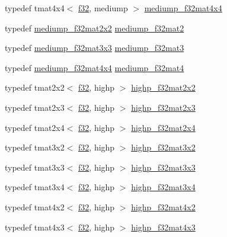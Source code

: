 \begin{DoxyCompactItemize}
typedef tmat4x4$<$ \hyperlink{group__gtc__type__precision_ga0ec999b57f5330d9021256e96038df04}{f32}, mediump $>$ \hyperlink{namespaceglm_a3c3a55da431fd8deef6a4ce3bb3bda99}{mediump\+\_\+f32mat4x4}
\item 
typedef \hyperlink{namespaceglm_a4b54e9273e523b0e07e5a0c92eb1ff9e}{mediump\+\_\+f32mat2x2} \hyperlink{namespaceglm_a103735a38477f7c389b36aae0fbdf274}{mediump\+\_\+f32mat2}
\item 
typedef \hyperlink{namespaceglm_a40d94024c0ce48a6819a25d16a7955b7}{mediump\+\_\+f32mat3x3} \hyperlink{namespaceglm_ae263a08ef179894fdd36f9a51698c4ab}{mediump\+\_\+f32mat3}
\item 
typedef \hyperlink{namespaceglm_a3c3a55da431fd8deef6a4ce3bb3bda99}{mediump\+\_\+f32mat4x4} \hyperlink{namespaceglm_a56bd98ec31b6abc0315d688d4ecd94a0}{mediump\+\_\+f32mat4}
\item 
typedef tmat2x2$<$ \hyperlink{group__gtc__type__precision_ga0ec999b57f5330d9021256e96038df04}{f32}, highp $>$ \hyperlink{namespaceglm_ab78dad85a95f5fcf418769d76c8fbad1}{highp\+\_\+f32mat2x2}
\item 
typedef tmat2x3$<$ \hyperlink{group__gtc__type__precision_ga0ec999b57f5330d9021256e96038df04}{f32}, highp $>$ \hyperlink{namespaceglm_a6dd41ee79c5e18a722ae8d27e86179cb}{highp\+\_\+f32mat2x3}
\item 
typedef tmat2x4$<$ \hyperlink{group__gtc__type__precision_ga0ec999b57f5330d9021256e96038df04}{f32}, highp $>$ \hyperlink{namespaceglm_a33881add501a1c4b3a6a9706bc376310}{highp\+\_\+f32mat2x4}
\item 
typedef tmat3x2$<$ \hyperlink{group__gtc__type__precision_ga0ec999b57f5330d9021256e96038df04}{f32}, highp $>$ \hyperlink{namespaceglm_a699e5b17f611aade662d1f0e45660150}{highp\+\_\+f32mat3x2}
\item 
typedef tmat3x3$<$ \hyperlink{group__gtc__type__precision_ga0ec999b57f5330d9021256e96038df04}{f32}, highp $>$ \hyperlink{namespaceglm_a54f70d88a2ef282af2dd5750f518645d}{highp\+\_\+f32mat3x3}
\item 
typedef tmat3x4$<$ \hyperlink{group__gtc__type__precision_ga0ec999b57f5330d9021256e96038df04}{f32}, highp $>$ \hyperlink{namespaceglm_a263a7304ad89c61bc70ede5ac2232ef3}{highp\+\_\+f32mat3x4}
\item 
typedef tmat4x2$<$ \hyperlink{group__gtc__type__precision_ga0ec999b57f5330d9021256e96038df04}{f32}, highp $>$ \hyperlink{namespaceglm_a7f365f980be86c2b8063cd13291653d6}{highp\+\_\+f32mat4x2}
\item 
typedef tmat4x3$<$ \hyperlink{group__gtc__type__precision_ga0ec999b57f5330d9021256e96038df04}{f32}, highp $>$ \hyperlink{namespaceglm_a03b4316160ac40bf259a553f719bca24}{highp\+\_\+f32mat4x3}

\end{DoxyCompactItemize}
